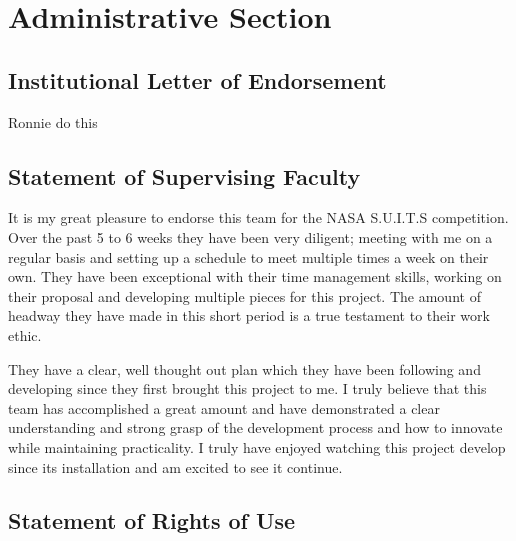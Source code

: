 \documentclass{article}
\let\Oldsection\section
\renewcommand{\section}{\FloatBarrier\Oldsection}
\let\Oldsubsection\subsection
\renewcommand{\subsection}{\FloatBarrier\Oldsubsection}
\begin{document}
\newpage

\section{Administrative Section}

\subsection{Institutional Letter of Endorsement}

Ronnie do this

\newpage

\subsection{Statement of Supervising Faculty}


It is my great pleasure to endorse this team for the NASA S.U.I.T.S competition. Over the past 5 to 6 weeks they have been very diligent; meeting with me on a regular basis and setting up a schedule to meet multiple times a week on their own. They have been exceptional with their time management skills, working on their proposal and developing multiple pieces for this project. The amount of headway they have made in this short period is a true testament to their work ethic.  

They have a clear, well thought out plan which they have been following and developing since they first brought this project to me. I truly believe that this team has accomplished a great amount and have demonstrated a clear understanding and strong grasp of the development process and how to innovate while maintaining practicality. I truly have enjoyed watching this project develop since its installation and am excited to see it continue.

\newpage

\subsection{Statement of Rights of Use}
\end{document}
